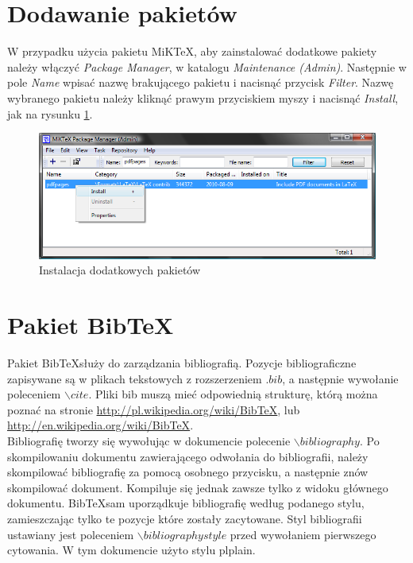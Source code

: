 \section{Dodawanie pakietów}
\label{sec:tresc:pakiety}

W przypadku użycia pakietu MiKTeX, aby zainstalować dodatkowe pakiety należy włączyć {\itshape Package Manager}, w katalogu {\itshape Maintenance (Admin)}. Następnie w pole {\itshape Name} wpisać nazwę brakującego pakietu i nacisnąć przycisk {\itshape Filter}. Nazwę wybranego pakietu należy kliknąć prawym przyciskiem myszy i nacisnąć {\itshape Install}, jak na rysunku \ref{fig:pakiety}.

\begin{figure}[h]
	\begin{center}
		\includegraphics[width = 12cm]{figures/pakiety.png}
		\caption{Instalacja dodatkowych pakietów}
		\label{fig:pakiety}
	\end{center}
\end{figure}

\section{Pakiet Bib\TeX}
\label{sec:tresc:bibtex}

Pakiet Bib\TeX służy do zarządzania bibliografią. Pozycje bibliograficzne zapisywane są w plikach tekstowych z rozszerzeniem $.bib$, a następnie wywołanie poleceniem $\backslash cite$. Pliki bib muszą mieć odpowiednią strukturę, którą można poznać na stronie \url{http://pl.wikipedia.org/wiki/BibTeX}, lub \url{http://en.wikipedia.org/wiki/BibTeX}.\\
Bibliografię tworzy się wywołując w dokumencie polecenie $\backslash bibliography$. Po skompilowaniu dokumentu zawierającego odwołania do bibliografii, należy skompilować bibliografię za pomocą osobnego przycisku, a następnie znów skompilować dokument. Kompiluje się jednak zawsze tylko z widoku głównego dokumentu. Bib\TeX sam uporządkuje bibliografię według podanego stylu, zamieszczając tylko te pozycje które zostały zacytowane. Styl bibliografii ustawiany jest poleceniem $\backslash bibliographystyle$ przed wywołaniem pierwszego cytowania. W tym dokumencie użyto stylu plplain.
